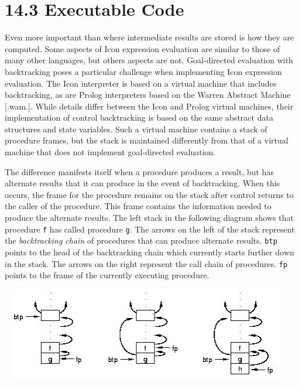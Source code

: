 \section[14.3 Executable Code]{14.3 Executable Code}

Even more important than where intermediate results are stored is how
they are computed. Some aspects of Icon expression evaluation are
similar to those of many other languages, but others aspects are
not. Goal-directed evaluation with backtracking poses a particular
challenge when implementing Icon expression evaluation. The Icon
interpreter is based on a virtual machine that includes backtracking,
as are Prolog interpreters based on the Warren Abstract Machine
[.wam.]. While details differ between the Icon and Prolog virtual
machines, their implementation of control backtracking is based on the
same abstract data structures and state variables. Such a virtual
machine contains a stack of procedure frames, but the stack is
maintained differently from that of a virtual machine that does not
implement goal-directed evaluation.

The difference manifests itself when a procedure produces a result,
but has alternate results that it can produce in the event of
backtracking. When this occurs, the frame for the procedure remains on
the stack after control returns to the caller of the procedure. This
frame contains the information needed to produce the alternate
results. The left stack in the following diagram shows that procedure
\texttt{f} has called procedure \texttt{g}. The arrows on the left of
the stack represent the \textit{backtracking chain} of procedures that
can produce alternate results. \texttt{btp} points to the head of the
backtracking chain which currently starts further down in the
stack. The arrows on the right represent the call chain of procedures.
\texttt{fp} points to the frame of the currently executing procedure.

{\centering{}
 \includegraphics[width=5.0319in,height=1.6346in]{kw/figure2-1.png}  
\par}



